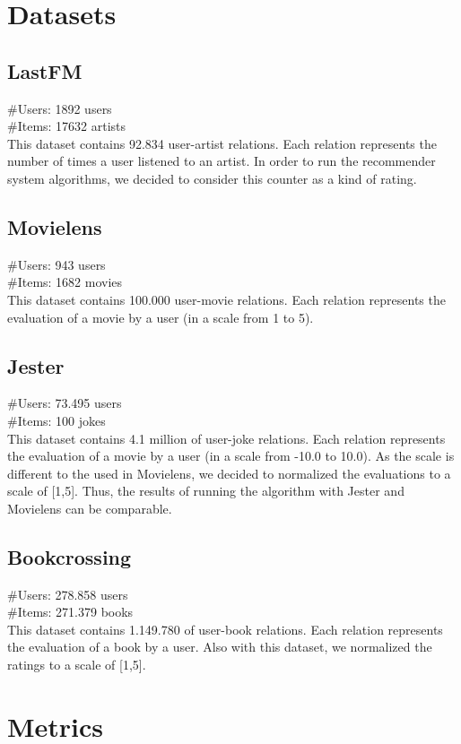 \documentclass[a4paper]{article}
\begin{document}
\section{Datasets}
\subsection{LastFM}
\#Users: 1892 users \\
\#Items: 17632 artists \\
This dataset contains 92.834 user-artist relations. Each relation represents the number of times a user listened to an artist. In order to run the recommender system algorithms, we decided to consider this counter as a kind of rating.

\subsection{Movielens}
\#Users: 943 users \\
\#Items: 1682  movies \\
This dataset contains 100.000 user-movie relations. Each relation represents the evaluation of a movie by a user (in a scale from 1 to 5).

\subsection{Jester}
\#Users: 73.495 users \\
\#Items: 100 jokes \\
This dataset contains 4.1 million of user-joke relations. Each relation represents the evaluation of a movie by a user (in a scale from -10.0 to 10.0). As the scale is different to the used in Movielens, we decided to normalized the evaluations to a scale of [1,5]. Thus, the results of running the algorithm with Jester and Movielens can be comparable.

\subsection{Bookcrossing}
\#Users: 278.858 users \\
\#Items: 271.379 books \\
This dataset contains 1.149.780 of user-book relations. Each relation represents the evaluation of a book by a user. Also with this dataset, we normalized the ratings to a scale of [1,5].

\section{Metrics}
\end{document}

